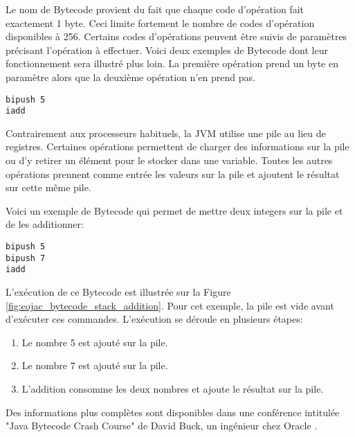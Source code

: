 Le nom de \gls{Bytecode} provient du fait que chaque code d'opération fait exactement 1 byte. Ceci limite fortement le nombre de codes d'opération disponibles à 256. Certains codes d'opérations peuvent être suivis de paramètres précisant l'opération à effectuer. Voici deux exemples de \gls{Bytecode} dont leur fonctionnement sera illustré plus loin. La première opération prend un byte en paramètre alors que la deuxième opération n'en prend pas.
\begin{verbatim}
bipush 5
iadd
\end{verbatim}

Contrairement aux processeurs habituels, la \gls{JVM} utilise une pile au lieu de registres. Certaines opérations permettent de charger des informations sur la pile ou d'y retirer un élément pour le stocker dans une variable. Toutes les autres opérations prennent comme entrée les valeurs sur la pile et ajoutent le résultat sur cette même pile.

Voici un exemple de \gls{Bytecode} qui permet de mettre deux integers sur la pile et de les additionner:
\begin{verbatim}
bipush 5
bipush 7
iadd
\end{verbatim}

\begin{minipage2}
L'exécution de ce \gls{Bytecode} est illustrée sur la Figure \ref{fig:cojac_bytecode_stack_addition}. Pour cet exemple, la pile est vide avant d'exécuter ces commandes. L'exécution se déroule en plusieurs étapes:

\begin{enumerate}
    \item Le nombre 5 est ajouté sur la pile.
    \item Le nombre 7 est ajouté sur la pile.
    \item L'addition consomme les deux nombres et ajoute le résultat sur la pile.
\end{enumerate}
\end{minipage2}

\begin{minipage}{\linewidth}%
\label{fig:cojac_bytecode_stack_addition}
\end{minipage}

Des informations plus complètes sont disponibles dans une conférence intitulée "Java Bytecode Crash Course" de David Buck, un ingénieur chez Oracle \cite{java-bytecode-video}.

